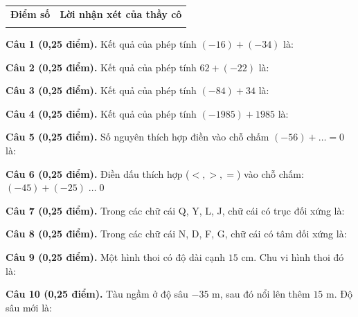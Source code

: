 \documentclass[12pt,a4paper]{article}
\begin{document}
\vspace{1.0mm}

\noindent
\begin{tabularx}{\linewidth}{|p{3.2cm}|X|}
\hline
\centering\textbf{Điểm số} & \centering\textbf{Lời nhận xét của thầy cô} \tabularnewline
\rule{0pt}{1.8cm} & \\
\hline
\end{tabularx}

\vspace{1.0mm}
\noindent\textbf{Câu 1 (0,25 điểm).} Kết quả của phép tính $(-16) + (-34)$ là: \par\vspace{0.25mm}
\noindent\textbf{Câu 2 (0,25 điểm).} Kết quả của phép tính $62 + (-22)$ là: \par\vspace{0.25mm}
\noindent\textbf{Câu 3 (0,25 điểm).} Kết quả của phép tính $(-84) + 34$ là: \par\vspace{0.25mm}
\noindent\textbf{Câu 4 (0,25 điểm).} Kết quả của phép tính $(-1985) + 1985$ là: \par\vspace{0.25mm}
\noindent\textbf{Câu 5 (0,25 điểm).} Số nguyên thích hợp điền vào chỗ chấm $(-56) + \dots = 0$ là: \par\vspace{0.25mm}
\noindent\textbf{Câu 6 (0,25 điểm).} Điền dấu thích hợp ($<, >, =$) vào chỗ chấm: $(-45) + (-25) \; \dots \; 0$ \shortans{<}\par\vspace{0.25mm}
\noindent\textbf{Câu 7 (0,25 điểm).} Trong các chữ cái Q, Y, L, J, chữ cái có trục đối xứng là: \par\vspace{0.25mm}
\noindent\textbf{Câu 8 (0,25 điểm).} Trong các chữ cái N, D, F, G, chữ cái có tâm đối xứng là: \par\vspace{0.25mm}
\noindent\textbf{Câu 9 (0,25 điểm).} Một hình thoi có độ dài cạnh $15\text{ cm}$. Chu vi hình thoi đó là: \par\vspace{0.25mm}
\noindent\textbf{Câu 10 (0,25 điểm).} Tàu ngầm ở độ sâu $-35\text{ m}$, sau đó nổi lên thêm $15\text{ m}$. Độ sâu mới là: \par\vspace{0.25mm}
\end{document}
